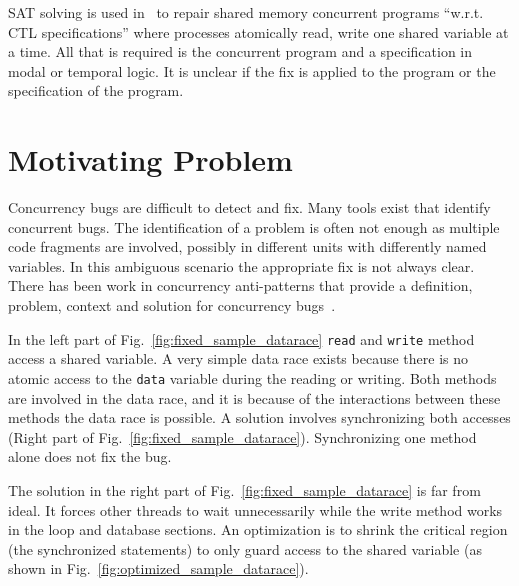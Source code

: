 \documentclass{llncs}
\begin{document}
SAT solving is used in~\cite{AY07}  to repair shared memory concurrent programs
``w.r.t. CTL specifications'' where processes atomically read, write one shared
variable at a time. All that is required is the concurrent program and a
specification in modal or temporal logic. It is unclear if the fix is applied
to the program or the specification of the program.

\section{Motivating Problem}
\label{sec:motivation}

Concurrency bugs are difficult to detect and fix. Many tools exist that
identify concurrent bugs. The identification of a problem is often not enough
as multiple code fragments are involved, possibly in different units with
differently named variables. In this ambiguous scenario the appropriate fix is
not always clear. There has been work in concurrency anti-patterns that provide
a definition, problem, context and solution for concurrency bugs~\cite{BJ09,FKLV12}.

In the left part of Fig.~\ref{fig:fixed_sample_datarace} \texttt{read} and
\texttt{write} method access a shared variable. A very simple data race exists
because there is no atomic access to the \texttt{data} variable during the
reading or writing. Both methods are involved in the data race, and it is
because of the interactions between these methods the data race is possible. A
solution involves synchronizing both accesses (Right part of
Fig.~\ref{fig:fixed_sample_datarace}). Synchronizing one method alone does
not fix the bug.

The solution in the right part of Fig.~\ref{fig:fixed_sample_datarace} is far
from ideal. It forces other threads to wait unnecessarily while the write
method works in the loop and database sections. An optimization is to shrink
the critical region (the synchronized statements) to only guard access to the
shared variable (as shown in Fig.~\ref{fig:optimized_sample_datarace}).
\end{document}
